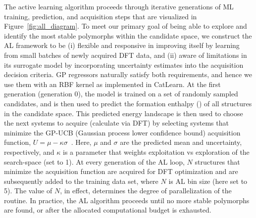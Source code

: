 %
%
The active learning algorithm proceeds through iterative generations of ML training, prediction, and acquisition steps that are visualized in Figure~\ref{fig:all_diagram}.
%
To meet our primary goal of being able to explore and identify the most stable polymorphs within the candidate space,
we construct the AL framework to be
(i) flexible and responsive in improving itself by learning from small batches of newly acquired DFT data,
and (ii) aware of limitations in its surrogate model by incorporating uncertainty estimates into the acquisition decision criteria.
%
GP regressors naturally satisfy both requirements,
and hence we use them with an RBF kernel as implemented in CatLearn.
\cite{hansen2019atomistic,CatLearn_Repo}
%
%
At the first generation (generation 0), the model is trained on a set of randomly sampled candidates,
and is then used to predict the formation enthalpy (\DHf) of all structures in the candidate space.
%
This predicted energy landscape is then used to choose the next systems to acquire (calculate via DFT) by selecting systems that minimize the GP-UCB (Gaussian process lower confidence bound) acquisition function,
$U = \mu - \kappa \sigma$~\cite{Cox1992}.
%
Here, $\mu$ and $\sigma$ are the predicted \DHf mean and uncertainty, respectively,
and $\kappa$ is a parameter that weights exploitation vs exploration of the search-space (set to 1).
%
At every generation of the AL loop, $N$ structures that minimize the acquisition function are acquired for DFT optimization and are subsequently added to the training data set, where $N$ is AL bin size (here set to 5).
%
The value of $N$, in effect, determines the degree of parallelization of the routine.
%
%
%
In practice, the AL algorithm proceeds until no more stable polymorphs are found, or after the allocated computational budget is exhausted.


